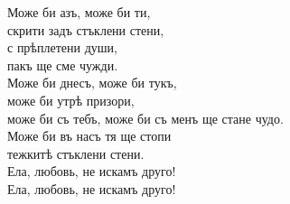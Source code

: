 \documentclass{article}
\begin{document}
 Може би азъ, може би ти, \\
 скрити задъ стъклени стени, \\
 с прѣплетени души, \\
 пакъ ще сме чужди. \\
 
 Може би днесъ, може би тукъ, \\
 може би утрѣ призори, \\
 може би съ тебъ, може би съ менъ 
 ще стане чудо. \\
 
 Може би въ насъ тя ще стопи \\
 тежкитѣ стъклени стени. \\
 Ела, любовь, 
 не искамъ друго! \\
 
 Ела, любовь,  
 не искамъ друго! \\
\end{document}
